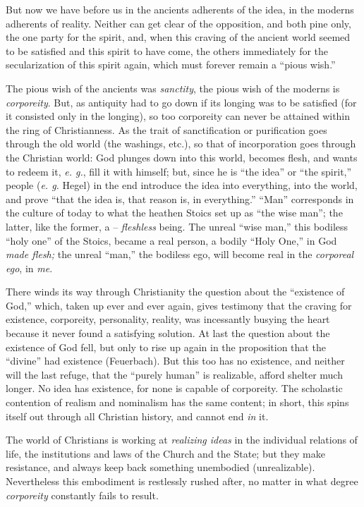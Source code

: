 \documentclass[12pt,a4paper]{book}
\begin{document}
But now we have before us in the ancients adherents of the idea, in the 
moderns adherents of reality. Neither can get clear of the opposition, and 
both pine only, the one party for the spirit, and, when this craving of the 
ancient world seemed to be satisfied and this spirit to have come, the others 
immediately for the secularization of this spirit again, which must forever 
remain a ``pious wish.''

The pious wish of the ancients was \textit{sanctity}, the pious wish of the 
moderns is \textit{corporeity}. But, as antiquity had to go down if its 
longing was to be satisfied (for it consisted only in the longing), so too 
corporeity can never be attained within the ring of Christianness. As the 
trait of sanctification or purification goes through the old world (the 
washings, etc.), so that of incorporation goes through the Christian world: 
God plunges down into this world, becomes flesh, and wants to redeem it, 
\textit{e. g.}, fill it with himself; but, since he is ``the idea'' or 
``the spirit,'' people (\textit{e. g.} Hegel) in the end introduce the idea 
into everything, into the world, and prove ``that the idea is, that reason 
is, in everything.'' ``Man'' corresponds in the culture of today to what 
the heathen Stoics set up as ``the wise man''; the latter, like the former, 
a -- \textit{fleshless} being. The unreal ``wise man,'' this bodiless 
``holy one'' of the Stoics, became a real person, a bodily ``Holy One,'' 
in God \textit{made flesh;} the unreal ``man,'' the bodiless ego, will 
become real in the \textit{corporeal ego}, in \textit{me}.

There winds its way through Christianity the question about the ``existence 
of God,'' which, taken up ever and ever again, gives testimony that the 
craving for existence, corporeity, personality, reality, was incessantly 
busying the heart because it never found a satisfying solution. At last the 
question about the existence of God fell, but only to rise up again in the 
proposition that the ``divine'' had existence (Feuerbach). But this too has 
no existence, and neither will the last refuge, that the ``purely human'' is 
realizable, afford shelter much longer. No idea has existence, for none is 
capable of corporeity. The scholastic contention of realism and nominalism has 
the same content; in short, this spins itself out through all Christian 
history, and cannot end \textit{in} it.

The world of Christians is working at \textit{realizing ideas} in the 
individual relations of life, the institutions and laws of the Church and the 
State; but they make resistance, and always keep back something unembodied 
(unrealizable). Nevertheless this embodiment is restlessly rushed after, no 
matter in what degree \textit{corporeity} constantly fails to result.
\end{document}
